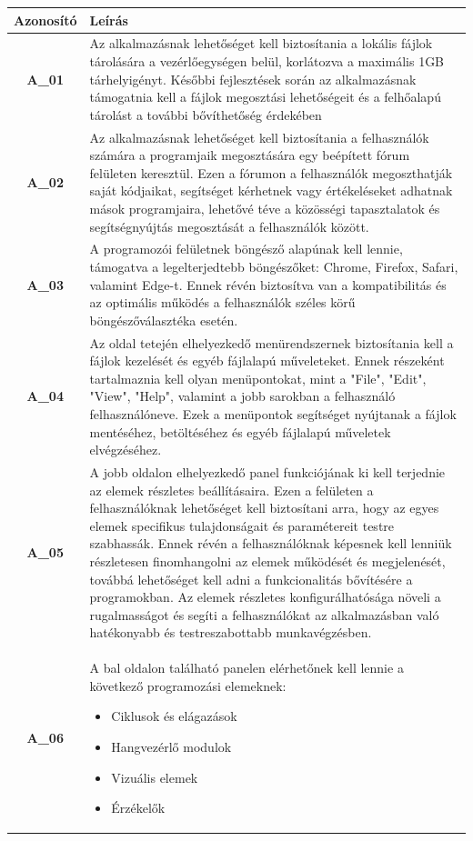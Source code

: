 \documentclass{article}
\begin{document}
\begin{table}[htbp]
\centering
\begin{tabular}{|c|p{14cm}|}
\hline
\textbf{Azonosító} & \textbf{Leírás}        \\ 
\hline
\textbf{A\_01} & Az alkalmazásnak lehetőséget kell biztosítania a lokális fájlok tárolására a vezérlőegységen belül, korlátozva a maximális 1GB tárhelyigényt. Későbbi fejlesztések során az alkalmazásnak támogatnia kell a fájlok megosztási lehetőségeit és a felhőalapú tárolást a további bővíthetőség érdekében \\\hline
\textbf{A\_02} & Az alkalmazásnak lehetőséget kell biztosítania a felhasználók számára a programjaik megosztására egy beépített fórum felületen keresztül. Ezen a fórumon a felhasználók megoszthatják saját kódjaikat, segítséget kérhetnek vagy értékeléseket adhatnak mások programjaira, lehetővé téve a közösségi tapasztalatok és segítségnyújtás megosztását a felhasználók között. \\\hline
\textbf{A\_03} & A programozói felületnek böngésző alapúnak kell lennie, támogatva a legelterjedtebb böngészőket: Chrome, Firefox, Safari, valamint Edge-t. Ennek révén biztosítva van a kompatibilitás és az optimális működés a felhasználók széles körű böngészőválasztéka esetén.\\\hline
\textbf{A\_04} & Az oldal tetején elhelyezkedő menürendszernek biztosítania kell a fájlok kezelését és egyéb fájlalapú műveleteket. Ennek részeként tartalmaznia kell olyan menüpontokat, mint a "File", "Edit", "View", "Help", valamint a jobb sarokban a felhasználó felhasználóneve. Ezek a menüpontok segítséget nyújtanak a fájlok mentéséhez, betöltéséhez és egyéb fájlalapú műveletek elvégzéséhez. \\\hline
\textbf{A\_05} & A jobb oldalon elhelyezkedő panel funkciójának ki kell terjednie az elemek részletes beállításaira. Ezen a felületen a felhasználóknak lehetőséget kell biztosítani arra, hogy az egyes elemek specifikus tulajdonságait és paramétereit testre szabhassák. Ennek révén a felhasználóknak képesnek kell lenniük részletesen finomhangolni az elemek működését és megjelenését, továbbá lehetőséget kell adni a funkcionalitás bővítésére a programokban. Az elemek részletes konfigurálhatósága növeli a rugalmasságot és segíti a felhasználókat az alkalmazásban való hatékonyabb és testreszabottabb munkavégzésben. \\\hline
\textbf{A\_06} & A bal oldalon található panelen elérhetőnek kell lennie a következő programozási elemeknek:
\begin{itemize}
    \item Ciklusok és elágazások
    \item Hangvezérlő modulok
    \item Vizuális elemek
    \item Érzékelők
\end{itemize}


\end{tabular}
\end{table}
\end{document}
